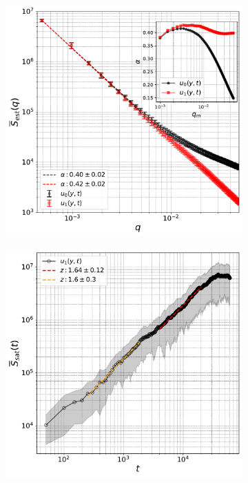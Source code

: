 \begin{figure}[!t]
\hspace*{-1.5cm}
\begin{subfigure}{0.55\textwidth}
    \centering
    \includegraphics[width=\textwidth]{Sq_est.pdf}
    \caption{}
\end{subfigure}    
\begin{subfigure}{0.55\textwidth}
    \centering
    \includegraphics[width=\textwidth]{Sq_sat.pdf}

\end{subfigure}
\end{figure}
